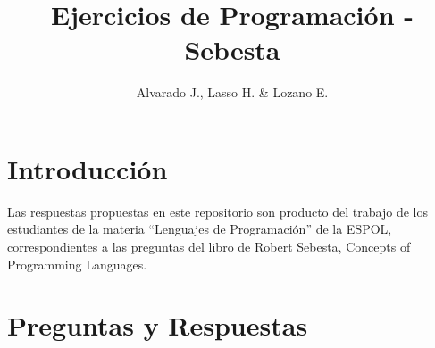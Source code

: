 \documentclass[12pt,oneside]{article}
\title{Ejercicios de Programación - Sebesta}
\author{Alvarado J., Lasso H. \& Lozano E.}
\begin{document}
\maketitle

	\section{Introducción}
	Las respuestas propuestas en este repositorio son producto del trabajo de los estudiantes de la materia ``Lenguajes de Programación'' de la ESPOL, correspondientes a las preguntas del libro de Robert Sebesta, Concepts of Programming Languages.

	\section{Preguntas y Respuestas}
\end{document}
